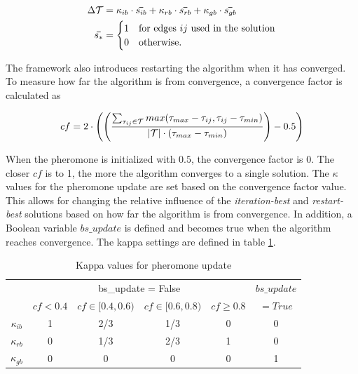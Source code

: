 \begin{align}
        \Delta\mathcal{T} &= \kappa_{ib} \cdot \bm\bar{s_{ib}} + \kappa_{rb} \cdot \bm\bar{s_{rb}} + \kappa_{gb} \cdot \bm\bar{s_{gb}} \\
        \bm\bar{s_*} &= 
            \begin{cases}
            1 & \text{for edges $ij$ used in the solution} \\
            0 & \text{otherwise}.
            \end{cases}
\end{align}

The framework also introduces restarting the algorithm when it has converged. To measure how far the algorithm is from convergence, a convergence factor is calculated as

\begin{equation}
    cf = 2 \cdot \left(\left(\frac{\sum_{\tau_{ij} \in \mathcal{T}}max(\tau_{max} - \tau_{ij}, \tau_{ij} - \tau_{min})}{|\mathcal{T}| \cdot (\tau_{max} - \tau_{min})}\right) - 0.5\right)
\end{equation}

When the pheromone is initialized with $0.5$, the convergence factor is $0$. The closer $cf$ is to 1, the more the algorithm converges to a single solution. The $\kappa$ values for the pheromone update are set based on the convergence factor value. This allows for changing the relative influence of the \textit{iteration-best} and \textit{restart-best} solutions based on how far the algorithm is from convergence. In addition, a Boolean variable $bs\_update$ is defined and becomes true when the algorithm reaches convergence. The kappa settings are defined in table \ref{tab:aco_kappas}.

\begin{table}[ht]
    \centering
    \begin{tabular}{c|cccc|c}
         & \multicolumn{4}{c|}{bs\_update = False} & $bs\_update$ \\
         & $cf < 0.4$ & $cf \in [0.4, 0.6)$ & $cf \in [0.6, 0.8)$ & $cf \geq 0.8$ & $= True$ \\
         \hline
        $\kappa_{ib}$ & 1 & 2/3 & 1/3 & 0 & 0 \\
        $\kappa_{rb}$ & 0 & 1/3 & 2/3 & 1 & 0 \\
        $\kappa_{gb}$ & 0 & 0 & 0 & 0 & 1 \\
    \end{tabular}
    \caption{Kappa values for pheromone update \cite{HCFMMAS}}
    \label{tab:aco_kappas}
\end{table}

